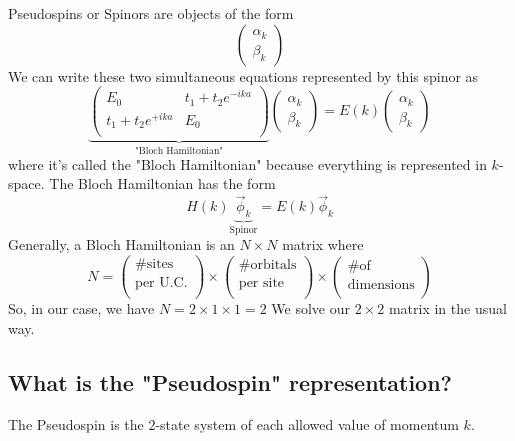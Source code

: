 \documentclass[11pt]{article}
\begin{document}
Pseudospins or Spinors are objects of the form $$ \begin{pmatrix}
  \alpha_{k} \\ \beta_{k}
\end{pmatrix} $$ We can write these two simultaneous equations represented by this spinor as $$ \underbrace{\begin{pmatrix}
  E_0 & t_1 + t_2 e^{-ika} \\
  t_1 + t_2 e^{+ika} & E_0 \\
\end{pmatrix}}_{\text{"Bloch Hamiltonian"}} \begin{pmatrix}
  \alpha_k \\ \beta_k
\end{pmatrix} =  E(k) \begin{pmatrix}
  \alpha_k \\ \beta_k
\end{pmatrix} $$ where it's called the "Bloch Hamiltonian" because everything is represented in $k$-space. The Bloch Hamiltonian has the form $$ H(k) \underbrace{\vec{\phi}_k}_{\text{Spinor}} = E(k) \vec{\phi}_k $$ Generally, a Bloch Hamiltonian is an $N \times N$ matrix where $$ N = \begin{pmatrix}
  \text{\# sites} \\
  \text{per U.C.} \\
\end{pmatrix} \times \begin{pmatrix}
  \text{\# orbitals} \\
  \text{per site} \\
\end{pmatrix} \times \begin{pmatrix}
  \text{\# of} \\
  \text{dimensions} \\
\end{pmatrix}  $$ So, in our case, we have $N = 2 \times 1 \times 1 = 2$ We solve our $2 \times 2$ matrix in the usual way. 

\vskip 1cm
\subsection{What is the "Pseudospin" representation?}
The Pseudospin is the $2$-state system of each allowed value of momentum $k$.

\vskip 1cm
\end{document}
